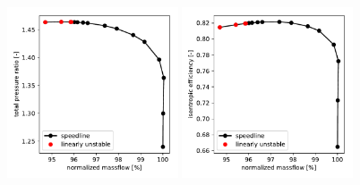 \documentclass[journal,final]{new-aiaa}
\begin{document}
\begin{figure}[htb]
	\centering   
	\includegraphics[width=0.45\textwidth]{PyPlot/eigen-vs-timedomain/annular-cascade-pr.pdf}
	\includegraphics[width=0.45\textwidth]{PyPlot/eigen-vs-timedomain/annular-cascade-eff.pdf}
	\caption{}
	\label{}
\end{figure}
\end{document}
